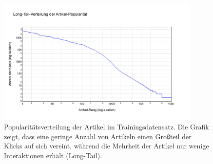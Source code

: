 
\begin{figure}[htbp]
    \centering
    \includegraphics[width=0.9\textwidth]{content/figures/svg/artikel_verteilung_train.pdf}
    \caption{Popularitätsverteilung der Artikel im Trainingsdatensatz. Die Grafik zeigt, dass eine geringe Anzahl von Artikeln einen Großteil der Klicks auf sich vereint, während die Mehrheit der Artikel nur wenige Interaktionen erhält (Long-Tail).}
    \label{fig:artikelverteilung_train}
\end{figure}